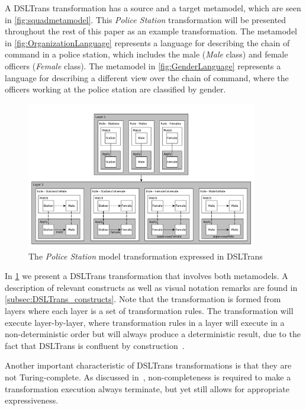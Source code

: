 A DSLTrans transformation has a source and a target metamodel, which are seen
in \cref{fig:squadmetamodel}. This \emph{Police Station}
transformation will be presented throughout
the rest of this paper as an example transformation. The metamodel
in \cref{fig:OrganizationLanguage} represents a language for describing
the chain of command in a police station, which includes the male (\emph{Male}
class) and female officers (\emph{Female} class). The metamodel in
\cref{fig:GenderLanguage} represents a language for describing a different
view over the chain of command, where the officers working at the police station
are classified by gender.

\begin{figure}[bht]
	\centering
		\includegraphics[width=0.9\textwidth]{./figures/policestation_dsltrans/transformation.pdf}
	\caption{The \emph{Police Station} model transformation expressed in DSLTrans}
	\label{fig:dsltransformation}
\end{figure}

In \cref{fig:dsltransformation} we present a DSLTrans transformation that involves both metamodels.  A description of relevant constructs as well as visual notation remarks are found in \cref{subsec:DSLTrans_constructs}. Note
that the transformation is formed
from layers where each layer is a set of transformation rules. The
transformation will execute layer-by-layer, where transformation rules in a layer will execute in a
non-deterministic order but will always produce a deterministic result, due to the fact that DSLTrans is confluent by construction~\cite{DBLP:conf/sle/BarrocaLAFS10}.

Another important characteristic of DSLTrans transformations is that they are not Turing-complete. As discussed in~\cite{DBLP:conf/sle/BarrocaLAFS10}, non-completeness is required to make a transformation execution always terminate, but yet still allows for appropriate expressiveness.

